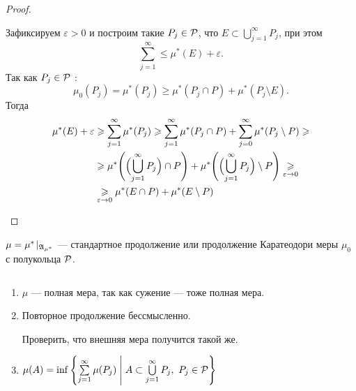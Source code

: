 \begin{proof}
\begin{description}
			Зафиксируем $ \varepsilon >0$ и построим такие $ P_j \in \P$, что $ E \subset \bigcup\limits_{j=1}^{\infty} P_j$, при этом
			\[
			\sum_{j=1}^{\infty} \le \mu^*( E )+\varepsilon 
			.\] 
			Так как $ P_j \in \P$ :
			\[
				\mu_0(P_j) = \mu^*( P_j ) \ge \mu^*( P_j \cap P ) + \mu^*( P_j \setminus E )
			.\] 
			Тогда
			\[
			\begin{aligned}
				\mu^*( E )  + \varepsilon  &\ge  \sum_{j=1}^{\infty} \mu^*( P_j )  \ge \sum_{j=1}^{\infty} \mu^*( P_j \cap P )  + \sum_{j=0}^{\infty} \mu^*( P_j \setminus P )  \ge \\
										   & \ge \mu^*\Biggl( \Bigl(\bigcup_{j=1}^{\infty} P_j \Bigr) \cap P\Biggr) + \mu^*\Biggl( \Bigl(  \bigcup_{j=1}^{\infty} P_j\Bigr)\setminus P\Biggr) \underset{\varepsilon  \to  0}{\ge} \\
										   &\underset{\varepsilon \to  0}{\ge} \mu^*( E \cap P ) + \mu^*( E \setminus P )
			\end{aligned}
			\]
	\end{description} 
\end{proof}
\begin{defn}
	$ \mu = \mu^{*}\!\mid_{\A_{\mu^{*}}}$ --- {\sf стандартное продолжение}  или {\sf продолжение Каратеодори} меры $ \mu_0$ с полукольца $ \P$. 
\end{defn}

\begin{note}
    $ $
	\begin{enumerate}
	    \item $ \mu$ --- полная мера, так как сужение --- тоже полная мера.
		\item Повторное продолжение бессмысленно. 
			\begin{prac}
			    Проверить, что внешняя мера получится такой же.
			\end{prac}
		\item $ \mu (A) = \inf \left\{ \sum\limits_{j=1}^{\infty} \mu  (P_j) \Biggm| A \subset \bigcup\limits_{j=1}^{\infty} P_j, ~P_j \in \P \right\} $
	\end{enumerate} 
\end{note}

